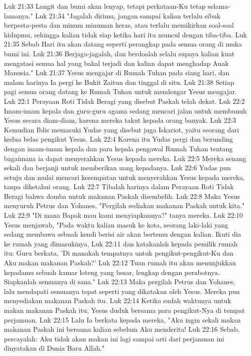 Luk 21:33  Langit dan bumi akan lenyap, tetapi perkataan-Ku tetap selama-lamanya."
Luk 21:34  "Jagalah dirimu, jangan sampai kalian terlalu sibuk berpesta-pesta dan minum minuman keras, atau terlalu memikirkan soal-soal hidupmu, sehingga kalian tidak siap ketika hari itu muncul dengan tiba-tiba.
Luk 21:35  Sebab Hari itu akan datang seperti perangkap pada semua orang di muka bumi ini.
Luk 21:36  Berjaga-jagalah, dan berdoalah selalu supaya kalian kuat mengatasi semua hal yang bakal terjadi dan kalian dapat menghadap Anak Manusia."
Luk 21:37  Yesus mengajar di Rumah Tuhan pada siang hari, dan malam harinya Ia pergi ke Bukit Zaitun dan tinggal di situ.
Luk 21:38  Setiap pagi semua orang datang ke Rumah Tuhan untuk mendengar Yesus mengajar.
Luk 22:1  Perayaan Roti Tidak Beragi yang disebut Paskah telah dekat.
Luk 22:2  Imam-imam kepala dan guru-guru agama sedang mencari jalan untuk membunuh Yesus secara diam-diam, karena mereka takut kepada orang banyak.
Luk 22:3  Kemudian Iblis memasuki Yudas yang disebut juga Iskariot, yaitu seorang dari kedua belas pengikut Yesus.
Luk 22:4  Karena itu Yudas pergi dan berunding dengan imam-imam kepala dan para kepala pengawal Rumah Tuhan tentang bagaimana ia dapat menyerahkan Yesus kepada mereka.
Luk 22:5  Mereka senang sekali dan berjanji untuk memberikan uang kepadanya.
Luk 22:6  Yudas pun setuju dan mulai mencari kesempatan untuk menyerahkan Yesus kepada mereka, tanpa diketahui orang.
Luk 22:7  Tibalah harinya dalam Perayaan Roti Tidak Beragi bahwa domba untuk makanan Paskah disembelih.
Luk 22:8  Maka Yesus menyuruh Petrus dan Yohanes, "Pergilah sediakan makanan Paskah untuk kita."
Luk 22:9  "Di mana Bapak mau kami menyiapkannya?" tanya mereka.
Luk 22:10  Yesus menjawab, "Pada waktu kalian masuk ke kota, seorang laki-laki yang sedang membawa sebuah kendi berisi air akan bertemu dengan kalian. Ikuti dia ke rumah yang dimasukinya,
Luk 22:11  dan katakanlah kepada pemilik rumah itu: Guru berkata, 'Di manakah tempatnya untuk pengikut-pengikut-Ku dan Aku makan makanan Paskah?'
Luk 22:12  Tuan rumah itu akan menunjukkan kepadamu sebuah kamar loteng yang besar, lengkap dengan perabotnya. Siapkanlah semuanya di sana."
Luk 22:13  Maka pergilah Petrus dan Yohanes, lalu mendapati semuanya tepat seperti yang dikatakan oleh Yesus. Mereka pun menyediakan makanan Paskah itu.
Luk 22:14  Ketika sudah waktunya untuk makan makanan Paskah itu, Yesus duduk bersama para pengikut-Nya di tempat perjamuan.
Luk 22:15  Lalu Ia berkata kepada mereka, "Aku ingin sekali makan makanan Paskah ini bersama kalian sebelum Aku menderita!
Luk 22:16  Sebab, percayalah: Aku tidak akan makan ini lagi sampai arti dari perjamuan ini dinyatakan di Dunia Baru Allah."
